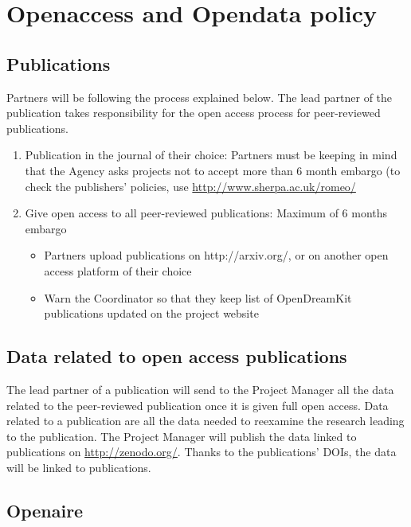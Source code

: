 \documentclass{deliverablereport}
\begin{document}
\section{Openaccess and Opendata policy}
\subsection{Publications}


Partners will be following the process explained below. The lead partner of the publication takes responsibility for the open access process for peer-reviewed publications.
\begin{enumerate}
\item{Publication in the journal of their choice:} Partners must be keeping in mind that the Agency asks projects not to accept more than 6 month embargo (to check the publishers’ policies, use \href{http://www.sherpa.ac.uk/romeo/}{http://www.sherpa.ac.uk/romeo/}
\item{Give open access to all peer-reviewed publications:} Maximum of 6 months embargo
\begin{itemize}
\item{Partners upload publications on http://arxiv.org/, or on another open access platform of their choice}
\item{Warn the Coordinator so that they keep list of OpenDreamKit publications updated on the project website}
\end{itemize}
\end{enumerate}


\subsection{Data related to open access publications}


The lead partner of a publication will send to the Project Manager all the data related to the peer-reviewed publication once it is given full open access. Data related to a publication are all the data needed to reexamine the research leading to the publication.
The Project Manager will publish the data linked to publications on \href{http://zenodo.org/}{http://zenodo.org/}. Thanks to the publications’ DOIs, the data will be linked to publications.



\subsection{Openaire}
\end{document}
